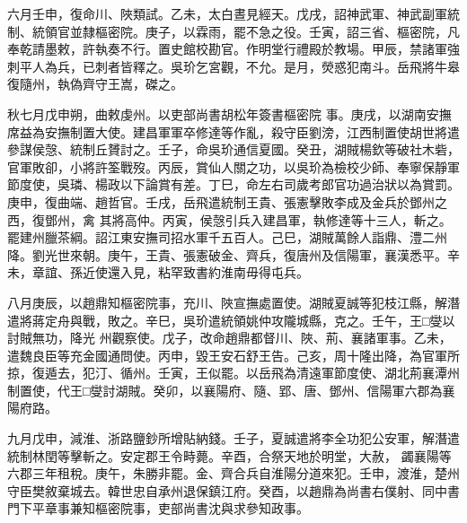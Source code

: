 \begin{pinyinscope}
 六月壬申，復命川、陜類試。乙未，太白晝見經天。戊戌，詔神武軍、神武副軍統制、統領官並隸樞密院。庚子，以霖雨，罷不急之役。壬寅，詔三省、樞密院，凡奉乾請墨敕，許執奏不行。置史館校勘官。作明堂行禮殿於教場。甲辰，禁諸軍強刺平人為兵，已刺者皆釋之。吳玠乞宮觀，不允。是月，熒惑犯南斗。岳飛將牛皋復隨州，執偽齊守王嵩，磔之。



 秋七月戊申朔，曲敕虔州。以吏部尚書胡松年簽書樞密院
 事。庚戌，以湖南安撫席益為安撫制置大使。建昌軍軍卒修達等作亂，殺守臣劉滂，江西制置使胡世將遣參謀侯愨、統制丘贇討之。壬子，命吳玠通信夏國。癸丑，湖賊楊欽等破社木砦，官軍敗卻，小將許筌戰歿。丙辰，賞仙人關之功，以吳玠為檢校少師、奉寧保靜軍節度使，吳璘、楊政以下論賞有差。丁巳，命左右司歲考郎官功過治狀以為賞罰。庚申，復曲端、趙哲官。壬戌，岳飛遣統制王貴、張憲擊敗李成及金兵於鄧州之西，復鄧州，禽
 其將高仲。丙寅，侯愨引兵入建昌軍，執修達等十三人，斬之。罷建州臘茶綱。詔江東安撫司招水軍千五百人。己巳，湖賊萬餘人詣鼎、澧二州降。劉光世來朝。庚午，王貴、張憲破金、齊兵，復唐州及信陽軍，襄漢悉平。辛未，章誼、孫近使還入見，粘罕致書約淮南毋得屯兵。



 八月庚辰，以趙鼎知樞密院事，充川、陜宣撫處置使。湖賊夏誠等犯枝江縣，解潛遣將蔣定舟與戰，敗之。辛巳，吳玠遣統領姚仲攻隴城縣，克之。壬午，王□燮以討賊無功，降光
 州觀察使。戊子，改命趙鼎都督川、陜、荊、襄諸軍事。乙未，遣魏良臣等充金國通問使。丙申，毀王安石舒王告。己亥，周十隆出降，為官軍所掠，復遁去，犯汀、循州。壬寅，王似罷。以岳飛為清遠軍節度使、湖北荊襄潭州制置使，代王□燮討湖賊。癸卯，以襄陽府、隨、郢、唐、鄧州、信陽軍六郡為襄陽府路。



 九月戊申，減淮、浙路鹽鈔所增貼納錢。壬子，夏誠遣將李全功犯公安軍，解潛遣統制林閏等擊斬之。安定郡王令畤薨。辛酉，合祭天地於明堂，大赦，
 蠲襄陽等六郡三年租稅。庚午，朱勝非罷。金、齊合兵自淮陽分道來犯。壬申，渡淮，楚州守臣樊敘棄城去。韓世忠自承州退保鎮江府。癸酉，以趙鼎為尚書右僕射、同中書門下平章事兼知樞密院事，吏部尚書沈與求參知政事。




\end{pinyinscope}
